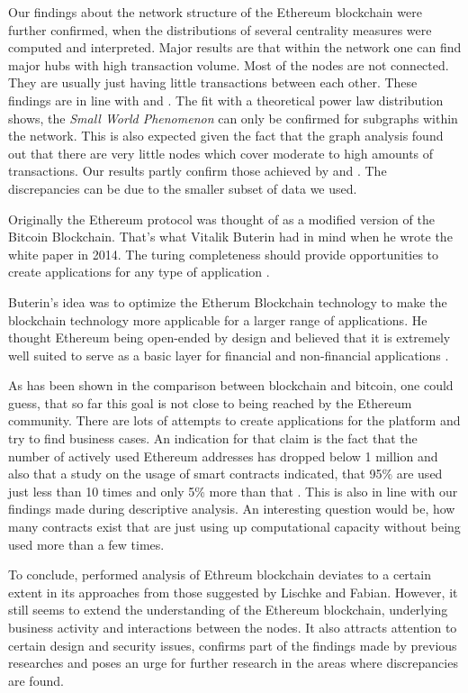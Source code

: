 Our findings about the network structure of the Ethereum blockchain were further confirmed, when the distributions of several centrality measures were computed and interpreted. 
Major results are that within the network one can find major hubs with high transaction volume. Most of the nodes are not connected. 
They are usually just having little transactions between each other. 
These findings are in line with \cite{anoaica2018quantitative} and \cite{kim2018measuring}.
The fit with a theoretical power law distribution shows, the \emph{Small World Phenomenon} can only be confirmed for subgraphs within the network.
This is also expected given the fact that the graph analysis found out that there are very little nodes which cover moderate to high amounts of transactions.
Our results partly confirm those achieved by \cite{somin2018network} and \cite{anoaica2018quantitative}.
The discrepancies can be due to the smaller subset of data we used.

Originally the Ethereum protocol was thought of as a modified version of the Bitcoin Blockchain. 
That's what Vitalik Buterin had in mind when he wrote the white paper in 2014. 
The turing completeness should provide opportunities to create applications for any type of application \cite{vitalikwhite}.

Buterin's idea was to optimize the Etherum Blockchain technology to make the blockchain technology more applicable for a larger range of applications. 
He thought Ethereum being open-ended by design and believed that it is extremely well suited to serve as a basic layer for financial and non-financial applications \cite{vitalikwhite}.

As has been shown in the comparison between blockchain and bitcoin, one could guess, that so far this goal is not close to being reached by the Ethereum community. 
There are lots of attempts to create applications for the platform and try to find business cases. 
An indication for that claim is the fact that the number of actively used Ethereum addresses has dropped below 1 million and also that a study on the usage of smart contracts indicated, that 95\% are used just less than 10 times and only 5\% more than that \cite{Chandersekhar2018}. This is also in line with our findings made during descriptive analysis.
An interesting question would be, how many contracts exist that are just using up computational capacity without being used more than a few times.

To conclude, performed analysis of Ethreum blockchain deviates to a certain extent in its approaches from those suggested by Lischke and Fabian.
However, it still seems to extend the understanding of the Ethereum blockchain, underlying business activity and interactions between the nodes. 
It also attracts attention to certain design and security issues, confirms part of the findings made by previous researches and poses an urge for further research in the areas where discrepancies are found.

